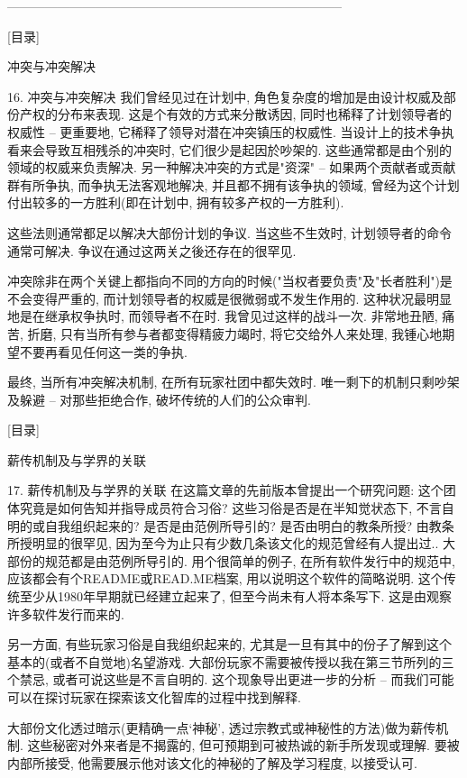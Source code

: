 \documentclass[a4paper,12pt,UTF8,twoside]{ctexbook}
\begin{document}
--------------------------------------------------------------------------------

[目录]

冲突与冲突解决

16. 冲突与冲突解决
我们曾经见过在计划中, 角色复杂度的增加是由设计权威及部份产权的分布来表现. 这是个有效的方式来分散诱因, 同时也稀释了计划领导者的权威性 -- 更重要地, 它稀释了领导对潜在冲突镇压的权威性.
当设计上的技术争执看来会导致互相残杀的冲突时,  它们很少是起因於吵架的. 这些通常都是由个别的领域的权威来负责解决.
另一种解决冲突的方式是"资深" -- 如果两个贡献者或贡献群有所争执, 而争执无法客观地解决, 并且都不拥有该争执的领域, 曾经为这个计划付出较多的一方胜利(即在计划中, 拥有较多产权的一方胜利).

这些法则通常都足以解决大部份计划的争议. 当这些不生效时, 计划领导者的命令通常可解决. 争议在通过这两关之後还存在的很罕见.

冲突除非在两个关键上都指向不同的方向的时候("当权者要负责"及"长者胜利")是不会变得严重的, 而计划领导者的权威是很微弱或不发生作用的. 这种状况最明显地是在继承权争执时, 而领导者不在时. 我曾见过这样的战斗一次. 非常地丑陋, 痛苦, 折磨, 只有当所有参与者都变得精疲力竭时, 将它交给外人来处理, 我锺心地期望不要再看见任何这一类的争执.

最终, 当所有冲突解决机制, 在所有玩家社团中都失效时. 唯一剩下的机制只剩吵架及躲避 -- 对那些拒绝合作, 破坏传统的人们的公众审判.


[目录]

薪传机制及与学界的关联

17. 薪传机制及与学界的关联
在这篇文章的先前版本曾提出一个研究问题: 这个团体究竟是如何告知并指导成员符合习俗?  这些习俗是否是在半知觉状态下, 不言自明的或自我组织起来的?  是否是由范例所导引的?  是否由明白的教条所授?
由教条所授明显的很罕见, 因为至今为止只有少数几条该文化的规范曾经有人提出过..
大部份的规范都是由范例所导引的. 用个很简单的例子, 在所有软件发行中的规范中, 应该都会有个README或READ.ME档案, 用以说明这个软件的简略说明. 这个传统至少从1980年早期就已经建立起来了, 但至今尚未有人将本条写下. 这是由观察许多软件发行而来的.

另一方面, 有些玩家习俗是自我组织起来的, 尤其是一旦有其中的份子了解到这个基本的(或者不自觉地)名望游戏. 大部份玩家不需要被传授以我在第三节所列的三个禁忌, 或者可说这些是不言自明的. 这个现象导出更进一步的分析 -- 而我们可能可以在探讨玩家在探索该文化智库的过程中找到解释.

大部份文化透过暗示(更精确一点`神秘', 透过宗教式或神秘性的方法)做为薪传机制. 这些秘密对外来者是不揭露的, 但可预期到可被热诚的新手所发现或理解. 要被内部所接受, 他需要展示他对该文化的神秘的了解及学习程度, 以接受认可.
\end{document}
